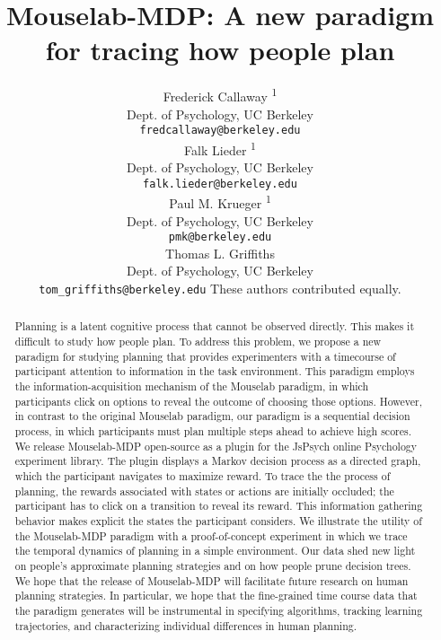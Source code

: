 \documentclass[11pt]{article} %
\title{Mouselab-MDP: A new paradigm for tracing how people plan}
\author{
Frederick Callaway \textsuperscript{\scriptsize 1}\\
Dept. of Psychology, UC Berkeley\\
\texttt{fredcallaway@berkeley.edu} \\
\And
Falk Lieder \textsuperscript{\scriptsize 1} \\
Dept. of Psychology, UC Berkeley \\
\texttt{falk.lieder@berkeley.edu} \\
\And
Paul M. Krueger \textsuperscript{\scriptsize 1}\\
Dept. of Psychology, UC Berkeley \\
\texttt{pmk@berkeley.edu} \\
\And
Thomas L. Griffiths \\
Dept. of Psychology, UC Berkeley\\
\texttt{tom\_griffiths@berkeley.edu}
\AND
    {\centering { \large \bf \textsuperscript{\scriptsize 1}} {\small These authors contributed equally.}}
}
\begin{document}
\maketitle

\begin{abstract}

Planning is a latent cognitive process that cannot be observed directly. This makes it difficult to study how people plan. 
To address this problem, we propose a new paradigm for studying planning that provides experimenters with a timecourse of participant attention to information in the task environment. This paradigm employs the information-acquisition mechanism of the Mouselab paradigm, in which participants click on options to reveal the outcome of choosing those options. However, in contrast to the original Mouselab paradigm, our paradigm is a sequential decision process, in which participants must plan multiple steps ahead to achieve high scores. We release Mouselab-MDP open-source as a plugin for the JsPsych online Psychology experiment library. The plugin displays a Markov decision process as a directed graph, which the participant navigates to maximize reward. To  trace the the process of planning, the rewards associated with states or actions are initially occluded; the participant has to click on a transition to reveal its reward. This information gathering behavior makes explicit the states the participant considers. We illustrate the utility of the Mouselab-MDP paradigm with a proof-of-concept experiment in which we trace the temporal dynamics of planning in a simple environment. Our data shed new light on people's approximate planning strategies and on how people prune decision trees.
We hope that the release of Mouselab-MDP will facilitate future research on human planning strategies. In particular, we hope that the fine-grained time course data that the paradigm generates will be instrumental in specifying algorithms, tracking learning trajectories, and characterizing individual differences in human planning.



\end{abstract}
\end{document}
